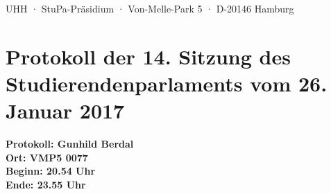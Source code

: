 \documentclass[ngerman,headheight=70pt]{scrartcl}
\begin{document}
    UHH · StuPa-Präsidium · Von-Melle-Park 5 · D-20146 Hamburg

    \section*{Protokoll der 14. Sitzung des Studierendenparlaments vom 26. Januar 2017}

    \textbf{Protokoll: Gunhild Berdal}\\
    \textbf{Ort: VMP5 0077}\\
    \textbf{Beginn: 20.54 Uhr}\\
    \textbf{Ende: 23.55 Uhr}

    \vspace{0.5cm}
\end{document}
